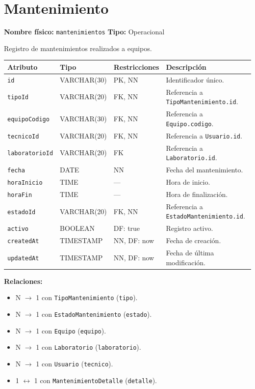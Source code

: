 \documentclass[12pt,a4paper]{article}
\newenvironment{tabladesc}[3]{%
  \section{#1}
  \textbf{Nombre físico:} \texttt{#2} \hfill \textbf{Tipo:} #3\par
  \medskip
}{%
  \bigskip
}
\begin{document}
\begin{tabladesc}{Mantenimiento}{mantenimientos}{Operacional}

Registro de mantenimientos realizados a equipos.

\bigskip
\begin{longtable}{L{3.5cm} L{2.5cm} L{2cm} L{7.5cm}}
\toprule
\textbf{Atributo} & \textbf{Tipo} & \textbf{Restricciones} & \textbf{Descripción} \\
\midrule
\endhead
\bottomrule
\endfoot
\texttt{id}          & VARCHAR(30)  & PK, NN & Identificador único. \\
\texttt{tipoId}      & VARCHAR(20)  & FK, NN & Referencia a \texttt{TipoMantenimiento.id}. \\
\texttt{equipoCodigo}& VARCHAR(30)  & FK, NN & Referencia a \texttt{Equipo.codigo}. \\
\texttt{tecnicoId}   & VARCHAR(20)  & FK, NN & Referencia a \texttt{Usuario.id}. \\
\texttt{laboratorioId}& VARCHAR(20) & FK     & Referencia a \texttt{Laboratorio.id}. \\
\texttt{fecha}       & DATE         & NN     & Fecha del mantenimiento. \\
\texttt{horaInicio}  & TIME         & ---    & Hora de inicio. \\
\texttt{horaFin}     & TIME         & ---    & Hora de finalización. \\
\texttt{estadoId}    & VARCHAR(20)  & FK, NN & Referencia a \texttt{EstadoMantenimiento.id}. \\
\texttt{activo}      & BOOLEAN      & DF: true & Registro activo. \\
\texttt{createdAt}   & TIMESTAMP    & NN, DF: now & Fecha de creación. \\
\texttt{updatedAt}   & TIMESTAMP    & NN, DF: now & Fecha de última modificación. \\
\bottomrule
\end{longtable}

\textbf{Relaciones:}
\begin{itemize}[nosep]
  \item N $\rightarrow$ 1 con \texttt{TipoMantenimiento} (\texttt{tipo}).
  \item N $\rightarrow$ 1 con \texttt{EstadoMantenimiento} (\texttt{estado}).
  \item N $\rightarrow$ 1 con \texttt{Equipo} (\texttt{equipo}).
  \item N $\rightarrow$ 1 con \texttt{Laboratorio} (\texttt{laboratorio}).
  \item N $\rightarrow$ 1 con \texttt{Usuario} (\texttt{tecnico}).
  \item 1 $\leftrightarrow$ 1 con \texttt{MantenimientoDetalle} (\texttt{detalle}).
\end{itemize}
\end{tabladesc}
\end{document}
